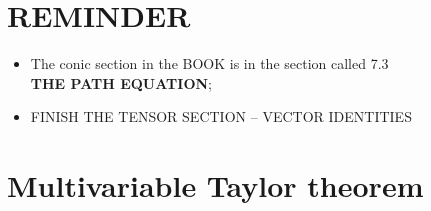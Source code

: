 \documentclass[12pt, a4paper]{article}
\begin{document}

\section{REMINDER}

\begin{itemize}
    \item The conic section in the BOOK is in the section called 7.3 \\ \textbf{THE PATH EQUATION};
    \item FINISH THE TENSOR SECTION -- VECTOR IDENTITIES
\end{itemize}

\section{Multivariable Taylor theorem}
\end{document}
